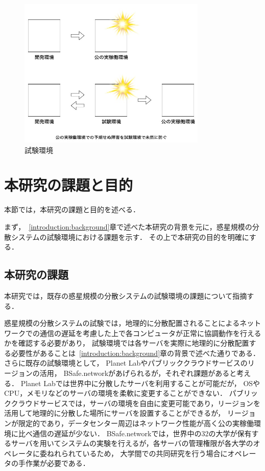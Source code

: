 \begin{figure}[htbp]
  \begin{center}
    \includegraphics[width=0.8\textwidth]{./figures/staging.jpg}
    \caption{試験環境}
  \end{center}
\end{figure}

\section{本研究の課題と目的}
\label{introduction:issue-aim}

本節では，本研究の課題と目的を述べる．

まず，~\ref{introduction:background}章で述べた本研究の背景を元に，惑星規模の分散システムの試験環境における課題を示す．
その上で本研究の目的を明確にする．

\subsection{本研究の課題}
\label{introduction:issue-aim:issue}

本研究では，既存の惑星規模の分散システムの試験環境の課題について指摘する．

惑星規模の分散システムの試験では，地理的に分散配置されることによるネットワークでの通信の遅延を考慮した上で各コンピュータが正常に協調動作を行えるかを確認する必要があり，
試験環境では各サーバを実際に地理的に分散配置する必要性があることは~\ref{introduction:background}章の背景で述べた通りである．
さらに既存の試験環境として， Planet Labやパブリッククラウドサービスのリージョンの活用， BSafe.networkがあげられるが，それぞれ課題があると考える．
Planet Labでは世界中に分散したサーバを利用することが可能だが， OSやCPU，メモリなどのサーバの環境を柔軟に変更することができない．
パブリッククラウドサービスでは，サーバの環境を自由に変更可能であり，リージョンを活用して地理的に分散した場所にサーバを設置することができるが，
リージョンが限定的であり，データセンター周辺はネットワーク性能が高く公の実稼働環境に比べ通信の遅延が少ない．
BSafe.networkでは，世界中の32の大学が保有するサーバを用いてシステムの実験を行えるが，各サーバの管理権限が各大学のオペレータに委ねれられているため，
大学間での共同研究を行う場合にオペレータの手作業が必要である．

